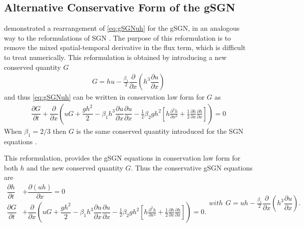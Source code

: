 \documentclass[10pt]{elsarticle}
\begin{document}
\subsection{Alternative Conservative Form of the gSGN}
\citet{Clamond-Dutykh-2018-237} demonstrated a rearrangement of \eqref{eq:gSGNuh} for the gSGN, in an analogous way to the reformulations of SGN \cite{Zoppou-etal-2017,Hank-etal-2010-2034,Li-2014-169}. The purpose of this reformulation is to remove the mixed spatial-temporal derivative in the flux term, which is difficult to treat numerically. This reformulation is obtained by introducing a new conserved quantity $G$
\begin{gather*}
G = hu - \frac{\beta_1}{2} \dfrac{\partial }{\partial x} \left ( h^3 \dfrac{\partial u}{\partial x} \right )
\end{gather*}
and thus \eqref{eq:gSGNuh} can be written in conservation law form for $G$ as
\begin{gather*}\label{eq:G_momentum}
\dfrac{\partial G }{\partial t}  + \dfrac{\partial}{\partial x} \left ( uG + \dfrac{gh^2}{2} - \beta_1 h^3\dfrac{\partial u}{\partial x}\dfrac{\partial u}{\partial x}  - \frac{1}{2} \beta_2 g h^2  \left[h\frac{\partial^2 h}{\partial x^2} + \frac{1}{2}\frac{\partial h}{\partial x}\frac{\partial h}{\partial x}\right]\right ) = 0
\end{gather*}
When $\beta_1 = 2/3$ then $G$ is the same conserved quantity introduced for the SGN equations \cite{Zoppou-etal-2017,Hank-etal-2010-2034,Li-2014-169}.

This reformulation, provides the gSGN equations in conservation law form for both $h$ and the new conserved quantity $G$. Thus the conservative gSGN equations are
\begin{subequations}
\begin{align}
\dfrac{\partial h}{\partial t} &+ \dfrac{\partial (uh)}{\partial x} = 0  \label{eq:gSGN_GG} \\
\dfrac{\partial G }{\partial t} & + \dfrac{\partial}{\partial x} \left ( uG + \dfrac{gh^2}{2} - \beta_1 h^3\dfrac{\partial u}{\partial x}\dfrac{\partial u}{\partial x}  - \frac{1}{2} \beta_2 g h^2  \left[h\frac{\partial^2 h}{\partial x^2} + \frac{1}{2}\frac{\partial h}{\partial x}\frac{\partial h}{\partial x}\right]\right ) = 0.
\label{eq:gSGN_Gh}
\end{align}
with
\begin{gather}\label{eq:G_divergent}
G = uh - \frac{\beta_1}{2}\dfrac{\partial }{\partial x} \left ( h^3 \dfrac{\partial u}{\partial x} \right ).
\end{gather}
\label{eq:gSGN_G}
\end{subequations}
\end{document}
